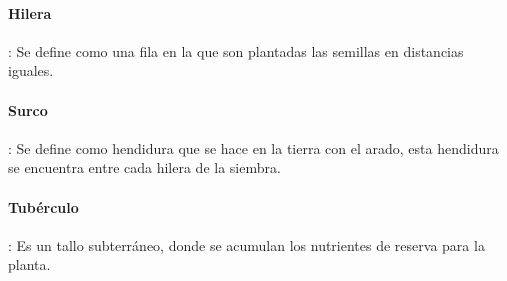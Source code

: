 \paragraph{Hilera}: Se define como una fila en la que son plantadas las semillas en distancias iguales.

\paragraph{Surco}: Se define como hendidura que se hace en la tierra con el arado, esta hendidura se encuentra entre cada hilera de la siembra.

\paragraph{Tubérculo}: Es un tallo subterráneo, donde se acumulan los nutrientes de reserva para la planta.



